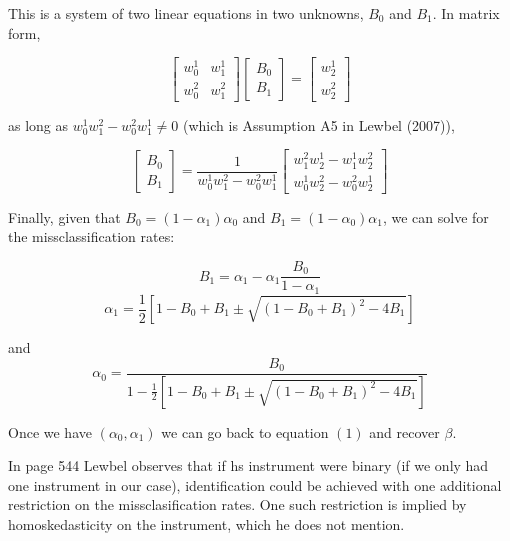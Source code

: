 This is a system of two linear equations in two unknowns, $B_{0}$
and $B_{1}$. In matrix form,

\[
\left[\begin{array}{cc}
w_{0}^{1} & w{}_{1}^{1}\\
w_{0}^{2} & w_{1}^{2}
\end{array}\right]\left[\begin{array}{c}
B_{0}\\
B_{1}
\end{array}\right]=\left[\begin{array}{c}
w_{2}^{1}\\
w_{2}^{2}
\end{array}\right]
\]


as long as $w_{0}^{1}w_{1}^{2}-w_{0}^{2}w_{1}^{1}\neq0$ (which is
Assumption A5 in Lewbel (2007)),

\[
\left[\begin{array}{c}
B_{0}\\
B_{1}
\end{array}\right]=\frac{1}{w_{0}^{1}w_{1}^{2}-w_{0}^{2}w_{1}^{1}}\left[\begin{array}{c}
w_{1}^{2}w_{2}^{1}-w_{1}^{1}w_{2}^{2}\\
w_{0}^{1}w_{2}^{2}-w_{0}^{2}w_{2}^{1}
\end{array}\right]
\]


Finally, given that $B_{0}=(1-\alpha_{1})\alpha_{0}$ and $B_{1}=(1-\alpha_{0})\alpha_{1}$,
we can solve for the missclassification rates:

\[
B_{1}=\alpha_{1}-\alpha_{1}\frac{B_{0}}{1-\alpha_{1}}
\]
\[
\alpha_{1}=\frac{1}{2}\left[1-B_{0}+B_{1}\pm\sqrt{(1-B_{0}+B_{1})^{2}-4B_{1}}\right]
\]


and 
\[
\alpha_{0}=\frac{B_{0}}{1-\frac{1}{2}\left[1-B_{0}+B_{1}\pm\sqrt{(1-B_{0}+B_{1})^{2}-4B_{1}}\right]}
\]

Once we have $(\alpha_{0},\alpha_{1})$ we can go back to equation
$(1)$ and recover $\beta$.

In page 544 Lewbel observes that if hs instrument were binary (if
we only had one instrument in our case), identification could be achieved
with one additional restriction on the missclasification rates. One
such restriction is implied by homoskedasticity on the instrument,
which he does not mention. 
